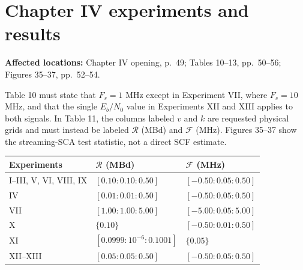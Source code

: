 \documentclass[12pt]{article}
\begin{document}
\section{Chapter IV experiments and results}

\noindent\textbf{Affected locations:} Chapter IV opening, p.~49; Tables 10--13, pp.~50--56; Figures 35--37, pp.~52--54.

Table 10 must state that $F_s=1$ MHz except in Experiment VII, where $F_s=10$ MHz, and that the single $E_b/N_0$ value in Experiments XII and XIII applies to both signals. In Table 11, the columns labeled $v$ and $k$ are requested physical grids and must instead be labeled $\mathcal R$ (MBd) and $\mathcal F$ (MHz). Figures 35--37 show the streaming-SCA test statistic, not a direct SCF estimate.

\begin{center}
\singlespacing
\small
\renewcommand{\arraystretch}{1.18}
\begin{tabularx}{\textwidth}{@{}L{1.45in}L{2.20in}Y@{}}
\toprule
\textbf{Experiments} & $\boldsymbol{\mathcal R}$ \textbf{(MBd)} & $\boldsymbol{\mathcal F}$ \textbf{(MHz)} \\
\midrule
I--III, V, VI, VIII, IX & $[0.10:0.10:0.50]$ & $[-0.50:0.05:0.50]$ \\
IV & $[0.01:0.01:0.50]$ & $[-0.50:0.05:0.50]$ \\
VII & $[1.00:1.00:5.00]$ & $[-5.00:0.05:5.00]$ \\
X & $\{0.10\}$ & $[-0.50:0.01:0.50]$ \\
XI & $[0.0999:10^{-6}:0.1001]$ & $\{0.05\}$ \\
XII--XIII & $[0.05:0.05:0.50]$ & $[-0.50:0.05:0.50]$ \\
\bottomrule
\end{tabularx}
\end{center}
\end{document}
